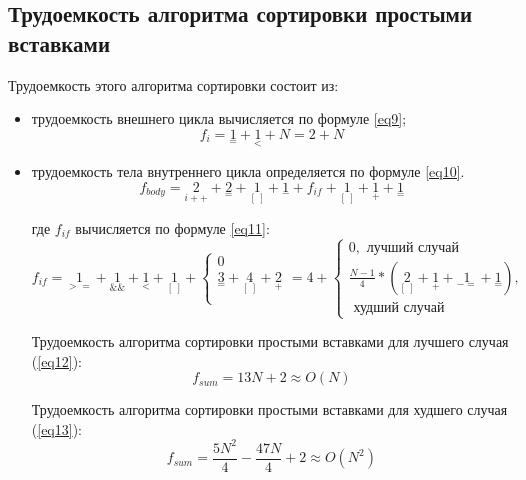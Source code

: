 \subsection{Трудоемкость алгоритма сортировки простыми вставками}
Трудоемкость этого алгоритма сортировки состоит из:
\begin{itemize}
	\item трудоемкость внешнего цикла вычисляется по формуле \ref{eq9};
	\begin{equation}
		\label{eq9}
		f_{i} = {\underset{=}{1}} + {\underset{<}{1}} + N= 2 + N
	\end{equation}

	\item трудоемкость тела внутреннего цикла определяется по формуле \ref{eq10}.
	\begin{equation}
		\label{eq10} 
		f_{body} = {\underset{i++}{2}} + {\underset{=}{2}} + {\underset{[\ ]}{1}} + {\underset{-}{1}} + f_{if} + {\underset{[\ ]}{1}} + {\underset{+}{1}} + {\underset{=}{1}}
	\end{equation}

	где $f_{if}$ вычисляется по формуле \ref{eq11}:
	\begin{equation}
		\label{eq11}
		f_{if} = {\underset{>=}{1}} + {\underset{\&\&}{1}} + {\underset{<}{1}} + {\underset{[\ ]}{1}} +
		\begin{cases}
			0\\
			{\underset{=}{3}} + {\underset{[\ ]}{4}} +{\underset{+}{2}}\\
		\end{cases}
		= 4 +
		\begin{cases}
			0, \text{  лучший случай}\\
			\frac{N-1}{4} * ({\underset{[\ ]}{2}} + {\underset{+}{1}} + {\underset{-=}{1}} + {\underset{=}{1}}),\\
			\text{  худший случай}
		\end{cases}
	\end{equation}

	Трудоемкость алгоритма сортировки простыми вставками для лучшего случая (\ref{eq12}):
	\begin{equation}
		\label{eq12}
		f_{sum} = 13N + 2 \approx O(N)
	\end{equation}
	
	Трудоемкость алгоритма сортировки простыми вставками для худшего случая (\ref{eq13}):
	\begin{equation}
		\label{eq13}
		f_{sum} = \frac{5N^2}{4} - \frac{47N}{4} + 2 \approx O(N^2)
	\end{equation}
\end{itemize}

